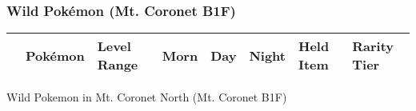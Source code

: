 \subsubsection{Wild Pokémon (Mt. Coronet B1F)}%
\label{ssubsec:WildPokmon(Mt.CoronetB1F)}%
\begin{longtable}{||l l l l l l l l||}%
\hline%
\rowcolor{gray}%
&Pokémon&Level Range&Morn&Day&Night&Held Item&Rarity Tier\\%
\hline%
\endhead%
\hline%
\end{longtable}%
\caption{Wild Pokemon in Mt. Coronet North (Mt. Coronet B1F)}